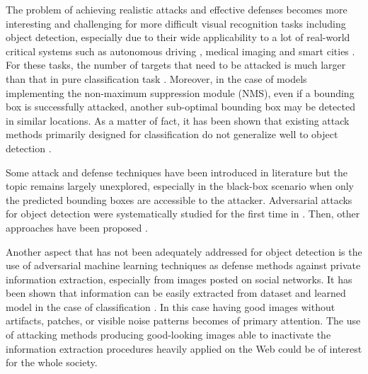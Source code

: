 The problem of achieving realistic attacks and effective defenses becomes more interesting and challenging for more difficult visual recognition tasks including object detection, especially due to their wide applicability to a lot of real-world critical systems such as autonomous driving \cite{feng2021review}, medical imaging \cite{chen2022recent} and smart cities \cite{ahmed2021adapting}. For these tasks,
the number of targets that need to be attacked is much larger
than that in pure classification task \cite{bose2018adversarial}. Moreover, in the case of models implementing the non-maximum suppression module (NMS),  even if a bounding box is successfully attacked, another sub-optimal bounding box may be detected in similar locations. As a matter of fact, it has been shown that existing attack methods primarily designed for classification do not generalize well to object detection \cite{shen2019advspade}. 

Some attack and defense techniques have been introduced in literature but the topic remains largely unexplored, especially in the black-box scenario when only the predicted bounding boxes are accessible to the attacker. Adversarial attacks for object detection were systematically studied for the first time in \cite{xie2017adversarial}.
Then, other approaches have been proposed \cite{arnab2018robustness,liang2021parallel,wang2020adversarial,procNoise_co2019, gu2021adversarial, Lu_2020_CVPR}.  

Another aspect that has not been adequately addressed for object detection is the use of adversarial machine learning techniques as defense methods against private information extraction, especially from images posted on social networks. It has been shown that information can be easily extracted from dataset and learned model in the case of classification \cite{bae2018security,shokri2015privacy,mireshghallah2020privacy,AGV-wiiat}.
In this case having good images without artifacts, patches, or visible noise patterns becomes of primary attention. The use of attacking methods producing good-looking images able to inactivate the information extraction procedures heavily applied on the Web could be of interest for the whole society.\\

